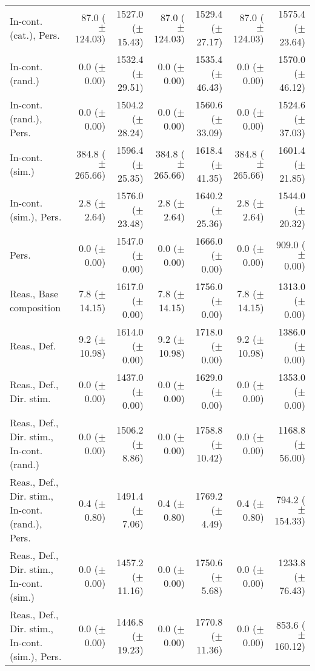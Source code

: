 \begin{table*}
\begin{tabular}{lrrrrrr}
        In-cont. (cat.), Pers. & 87.0 ($\pm$ 124.03) & 1527.0 ($\pm$ 15.43) & 87.0 ($\pm$ 124.03) & 1529.4 ($\pm$ 27.17) & 87.0 ($\pm$ 124.03) & 1575.4 ($\pm$ 23.64) \\
        In-cont. (rand.) & 0.0 ($\pm$ 0.00) & 1532.4 ($\pm$ 29.51) & 0.0 ($\pm$ 0.00) & 1535.4 ($\pm$ 46.43) & 0.0 ($\pm$ 0.00) & 1570.0 ($\pm$ 46.12) \\
        In-cont. (rand.), Pers. & 0.0 ($\pm$ 0.00) & 1504.2 ($\pm$ 28.24) & 0.0 ($\pm$ 0.00) & 1560.6 ($\pm$ 33.09) & 0.0 ($\pm$ 0.00) & 1524.6 ($\pm$ 37.03) \\
        In-cont. (sim.) & 384.8 ($\pm$ 265.66) & 1596.4 ($\pm$ 25.35) & 384.8 ($\pm$ 265.66) & 1618.4 ($\pm$ 41.35) & 384.8 ($\pm$ 265.66) & 1601.4 ($\pm$ 21.85) \\
        In-cont. (sim.), Pers. & 2.8 ($\pm$ 2.64) & 1576.0 ($\pm$ 23.48) & 2.8 ($\pm$ 2.64) & 1640.2 ($\pm$ 25.36) & 2.8 ($\pm$ 2.64) & 1544.0 ($\pm$ 20.32) \\
        Pers. & 0.0 ($\pm$ 0.00) & 1547.0 ($\pm$ 0.00) & 0.0 ($\pm$ 0.00) & 1666.0 ($\pm$ 0.00) & 0.0 ($\pm$ 0.00) & 909.0 ($\pm$ 0.00) \\
        Reas., Base composition & 7.8 ($\pm$ 14.15) & 1617.0 ($\pm$ 0.00) & 7.8 ($\pm$ 14.15) & 1756.0 ($\pm$ 0.00) & 7.8 ($\pm$ 14.15) & 1313.0 ($\pm$ 0.00) \\
        Reas., Def. & 9.2 ($\pm$ 10.98) & 1614.0 ($\pm$ 0.00) & 9.2 ($\pm$ 10.98) & 1718.0 ($\pm$ 0.00) & 9.2 ($\pm$ 10.98) & 1386.0 ($\pm$ 0.00) \\
        Reas., Def., Dir. stim. & 0.0 ($\pm$ 0.00) & 1437.0 ($\pm$ 0.00) & 0.0 ($\pm$ 0.00) & 1629.0 ($\pm$ 0.00) & 0.0 ($\pm$ 0.00) & 1353.0 ($\pm$ 0.00) \\
        Reas., Def., Dir. stim., In-cont. (rand.) & 0.0 ($\pm$ 0.00) & 1506.2 ($\pm$ 8.86) & 0.0 ($\pm$ 0.00) & 1758.8 ($\pm$ 10.42) & 0.0 ($\pm$ 0.00) & 1168.8 ($\pm$ 56.00) \\
        Reas., Def., Dir. stim., In-cont. (rand.), Pers. & 0.4 ($\pm$ 0.80) & 1491.4 ($\pm$ 7.06) & 0.4 ($\pm$ 0.80) & 1769.2 ($\pm$ 4.49) & 0.4 ($\pm$ 0.80) & 794.2 ($\pm$ 154.33) \\
        Reas., Def., Dir. stim., In-cont. (sim.) & 0.0 ($\pm$ 0.00) & 1457.2 ($\pm$ 11.16) & 0.0 ($\pm$ 0.00) & 1750.6 ($\pm$ 5.68) & 0.0 ($\pm$ 0.00) & 1233.8 ($\pm$ 76.43) \\
        Reas., Def., Dir. stim., In-cont. (sim.), Pers. & 0.0 ($\pm$ 0.00) & 1446.8 ($\pm$ 19.23) & 0.0 ($\pm$ 0.00) & 1770.8 ($\pm$ 11.36) & 0.0 ($\pm$ 0.00) & 853.6 ($\pm$ 160.12) \\

\end{tabular}
\end{table*}
